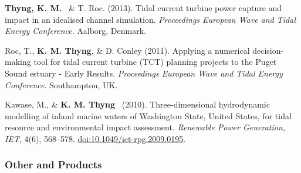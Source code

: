 \documentclass[10pt,letterpaper]{article}
\newcommand{\kmt}{\textbf{K. M. Thyng}}
\newcommand{\tkm}{\textbf{Thyng, K. M.}}
\renewenvironment{itemize}{
  \begin{list}{}{
    \setlength{\leftmargin}{1.5em}
    \setlength{\itemsep}{0.25em}
    \setlength{\parskip}{0pt}
    \setlength{\parsep}{0.25em}
  }
}{
  \end{list}
}
\begin{document}
\begin{itemize}
\item \tkm~ \& T. Roc. (2013). Tidal current turbine power capture and impact in an idealised channel simulation. \textit{Proceedings European Wave and Tidal Energy Conference}. Aalborg, Denmark.

\item Roc, T., \kmt, \& D. Conley (2011). Applying a numerical decision-making tool for tidal current turbine (TCT) planning projects to the Puget Sound estuary - Early Results. \textit{Proceedings European Wave and Tidal Energy Conference}. Southampton, UK.

\item Kawase, M., \& \kmt~ (2010). Three-dimensional hydrodynamic modelling of inland marine waters of Washington State, United States, for tidal resource and environmental impact assessment. \textit{Renewable Power Generation, IET}, 4(6), 568--578. \href{http://digital-library.theiet.org/content/journals/10.1049/iet-rpg.2009.0195}{doi:10.1049/iet-rpg.2009.0195}.

\end{itemize}

\subsubsection*{Other and Products}
\end{document}
